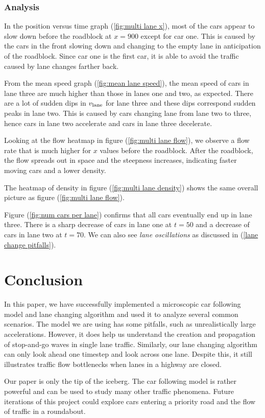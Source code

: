 \documentclass[12pt]{article}
\begin{document}
    \subsubsection{Analysis}

    In the position versus time graph (\ref{fig:multi lane x}), most of the cars appear to slow down before the roadblock at $x = 900$ except for car one. This is caused by the cars in the front slowing down and changing to the empty lane in anticipation of the roadblock. Since car one is the first car, it is able to avoid the traffic caused by lane changes farther back.
   
    From the mean speed graph (\ref{fig:mean lane speed}), the mean speed of cars in lane three are much higher than those in lanes one and two, as expected. There are a lot of sudden dips in $v_{\rm lane}$ for lane three and these dips correspond sudden peaks in lane two. This is caused by cars changing lane from lane two to three, hence cars in lane two accelerate and cars in lane three decelerate.

   Looking at the flow heatmap in figure (\ref{fig:multi lane flow}), we observe a  flow rate that is much higher for $x$ values before the roadblock. After the roadblock, the flow spreads out in space and the steepness increases, indicating faster moving cars and a lower density.

    The heatmap of density in figure (\ref{fig:multi lane density}) shows the same overall picture as figure (\ref{fig:multi lane flow}).

    Figure (\ref{fig:num cars per lane}) confirms that all cars eventually end up in lane three. There is a sharp decrease of cars in lane one at $t=50$ and a decrease of cars in lane two at $t = 70$. We can also see \textit{lane oscillations} as discussed in (\ref{lane change pitfalls}).

    \section{Conclusion}
    In this paper, we have successfully implemented a microscopic car following model and lane changing algorithm and used it to analyze several common scenarios. The model we are using has some pitfalls, such as unrealistically large accelerations. However, it does help us understand the creation and propagation of stop-and-go waves in single lane traffic. Similarly, our lane changing algorithm can only look ahead one timestep and look across one lane. Despite this, it still illustrates traffic flow bottlenecks when lanes in a highway are closed.

    Our paper is only the tip of the iceberg. The car following model is rather powerful and can be used to study many other traffic phenomena. Future iterations of this project could explore cars entering a priority road and the flow of traffic in a roundabout.
    
  \newpage    
    \printunsrtglossary[type=symbols,style=long,title={List of Symbols and Constants}]
    \newpage 
    \printbibliography
\end{document}
